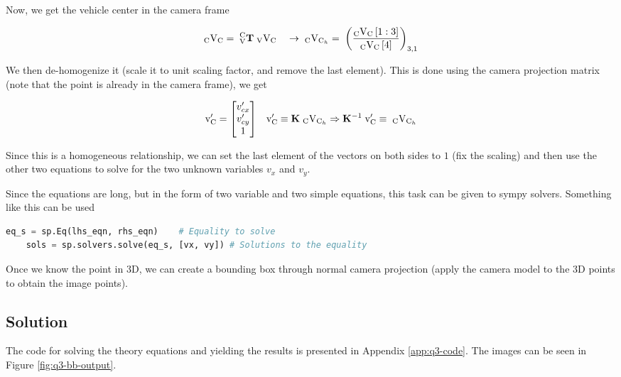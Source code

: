 Now, we get the vehicle center in the camera frame

\begin{equation*}
    _{\textrm{C}}\textup{V}_{\textup{C}} = \; ^{\textrm{C}}_{\textrm{V}}\mathbf{T} \; _{\textrm{V}}\textup{V}_{\textup{C}} \quad \rightarrow \;  _{\textrm{C}}\textup{V}_{\textup{C}_h} = \; \left( \frac{_{\textrm{C}}\textup{V}_{\textup{C}}\,[1:3]}{_{\textrm{C}}\textup{V}_{\textup{C}}\,[4]} \right )_{3, 1}
\end{equation*}

We then de-homogenize it (scale it to unit scaling factor, and remove the last element). This is done using the camera projection matrix (note that the point is already in the camera frame), we get

\begin{align*}
    \textup{v}'_{\textup{C}} = \begin{bmatrix}
    v'_{cx} \\ v'_{cy} \\ 1
    \end{bmatrix}
    &&
    \textup{v}'_{\textup{C}} \equiv \mathbf{K} \;
    _{\textrm{C}}\textup{V}_{\textup{C}_h} \Rightarrow 
    \mathbf{K}^{-1} \; \textup{v}'_{\textup{C}} \equiv \; _{\textrm{C}}\textup{V}_{\textup{C}_h}
\end{align*}

Since this is a homogeneous relationship, we can set the last element of the vectors on both sides to $1$ (fix the scaling) and then use the other two equations to solve for the two unknown variables $v_x$ and $v_y$.

Since the equations are long, but in the form of two variable and two simple equations, this task can be given to sympy solvers. Something like this can be used

\begin{lstlisting}[language=Python]
    eq_s = sp.Eq(lhs_eqn, rhs_eqn)    # Equality to solve
    sols = sp.solvers.solve(eq_s, [vx, vy]) # Solutions to the equality
\end{lstlisting}

Once we know the point in 3D, we can create a bounding box through normal camera projection (apply the camera model to the 3D points to obtain the image points).

\subsection{Solution}

The code for solving the theory equations and yielding the results is presented in Appendix \ref{app:q3-code}. The images can be seen in Figure \ref{fig:q3-bb-output}.

